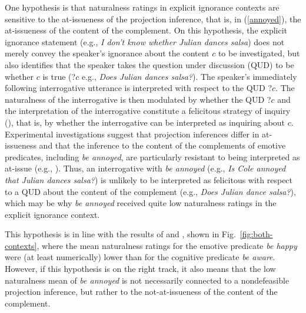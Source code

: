 \documentclass[11pt,fleqn]{article}
\newcommand{\6}{\mbox{$[\hspace*{-.6mm}[$}}
\newcommand{\9}{\mbox{$]\hspace*{-.6mm}]$}}
\begin{document}
One hypothesis is that naturalness ratings in explicit ignorance contexts are sensitive to the at-issueness of the projection inference, that is, in (\ref{annoyed}), the at-issueness of the content of the complement. On this hypothesis, the explicit ignorance statement (e.g., {\em I don't know whether Julian dances salsa}) does not merely convey the speaker's ignorance about the content $c$ to be investigated, but also identifies that the speaker takes the question under discussion (QUD) to be whether $c$ is true (?$c$ e.g., {\em Does Julian dances salsa?}). The speaker's immediately following interrogative utterance is interpreted with respect to the QUD ?$c$. The naturalness of the interrogative is then modulated by whether the QUD ?$c$  and the interpretation of the interrogative constitute a felicitous strategy of inquiry (\citealt[32f.]{roberts12}), that is,  by whether the interrogative can be interpreted as inquiring about $c$. Experimental investigations suggest that projection inferences differ in at-issueness and that the inference to the content of the complements of emotive predicates, including {\em be annoyed}, are particularly resistant to being interpreted as at-issue (e.g., \citealt{djaerv-etal2018,tbd-variability,degen-tonhauser-glossa}). Thus, an interrogative with {\em be annoyed} (e.g., {\em Is Cole annoyed that Julian dances salsa?}) is unlikely to be interpreted as felicitous with respect to a QUD about the content of the complement (e.g., {\em Does Julian dance salsa?}), which may be why {\em be annoyed} received quite low naturalness ratings in the explicit ignorance context. 

This hypothesis is in line with the results of \citealt[Exp.~3]{mandelkern-etal2020} and \citealt[Exp.~1]{kalomoiros-schwarz2024}, shown in Fig.~\ref{fig:both-contexts}, where the mean naturalness ratings for the emotive predicate \emph{be happy} were (at least numerically) lower than for the cognitive predicate \emph{be aware}. However, if this hypothesis is on the right track, it also means that the low naturalness mean of \emph{be annoyed} is not necessarily connected to a nondefeasible projection inference, but rather to the not-at-issueness of the content of the complement. 
\end{document}
